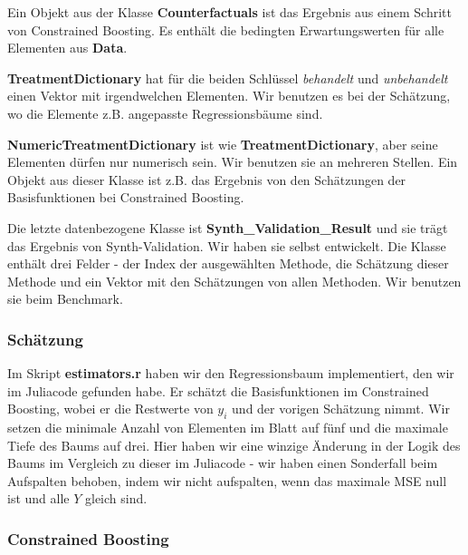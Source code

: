 \documentclass[12pt,a4paper,twoside]{scrartcl}
\numberwithin{equation}{section}
\begin{document}
\noindent
Ein Objekt aus der Klasse \textbf{Counterfactuals} ist das Ergebnis aus einem Schritt von Constrained Boosting. Es enthält die bedingten Erwartungswerten für alle Elementen aus \textbf{Data}.\par 

\noindent
\textbf{TreatmentDictionary} hat für die beiden Schlüssel \emph{behandelt} und \emph{unbehandelt} einen Vektor mit irgendwelchen Elementen. Wir benutzen es bei der Schätzung, wo die Elemente z.B. angepasste Regressionsbäume sind.\par	

\noindent
\textbf{NumericTreatmentDictionary} ist wie \textbf{TreatmentDictionary}, aber seine Elementen dürfen nur numerisch sein. Wir benutzen sie an mehreren Stellen. Ein Objekt aus dieser Klasse ist z.B. das Ergebnis von den Schätzungen der Basisfunktionen bei Constrained Boosting.\par

\noindent
Die letzte datenbezogene Klasse ist \textbf{Synth\_Validation\_Result} und sie trägt das Ergebnis von Synth-Validation. Wir haben sie selbst entwickelt. Die Klasse enthält drei Felder - der Index der ausgewählten Methode, die Schätzung dieser Methode und ein Vektor mit den Schätzungen von allen Methoden. Wir benutzen sie beim Benchmark. \par

\subsubsection{Schätzung}\label{subsubsec:schätung}
Im Skript \textbf{estimators.r} haben wir den Regressionsbaum implementiert, den wir im Juliacode gefunden habe. Er schätzt die Basisfunktionen im Constrained Boosting, wobei er die Restwerte von $y_i$ und der vorigen Schätzung nimmt. Wir setzen die minimale Anzahl von Elementen im Blatt auf fünf und die maximale Tiefe des Baums auf drei. Hier haben wir eine winzige Änderung in der Logik des Baums im Vergleich zu dieser im Juliacode - wir haben einen Sonderfall beim Aufspalten behoben, indem wir nicht aufspalten, wenn das maximale MSE null ist und alle $Y$ gleich sind.\par

\subsubsection{Constrained Boosting}\label{subsubsec:constrainedBoosting}
\end{document}
